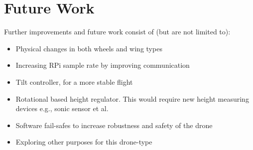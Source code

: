 \chapter{Future Work}\label{chap:futurework}
Further improvements and future work consist of (but are not limited to):
\begin{itemize}
    \item Physical changes in both wheels and wing types
    \item Increasing RPi sample rate by improving communication
    \item Tilt controller, for a more stable flight
    \item Rotational based height regulator. This would require new height measuring devices e.g., sonic sensor et al.
    \item Software fail-safes to increase robustness and safety of the drone
    \item Exploring other purposes for this drone-type
\end{itemize}

